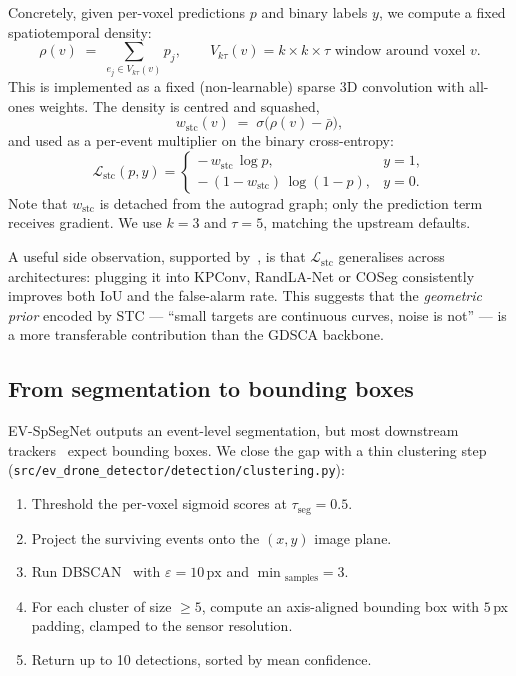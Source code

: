 \documentclass[11pt,a4paper]{article}
\begin{document}
Concretely, given per-voxel predictions $p$ and binary labels $y$,
we compute a fixed spatiotemporal density:
\begin{equation}
    \rho(v) \;=\; \sum_{e_j \in V_{k\tau}(v)} p_j,
    \qquad V_{k\tau}(v) = \text{$k\!\times\!k\!\times\!\tau$ window
    around voxel $v$.}
\end{equation}
This is implemented as a fixed (non-learnable) sparse 3D convolution
with all-ones weights. The density is centred and squashed,
\begin{equation}
    w_\text{stc}(v) \;=\; \sigma\bigl(\rho(v) - \bar{\rho}\bigr),
\end{equation}
and used as a per-event multiplier on the binary cross-entropy:
\begin{equation}
    \mathcal{L}_\text{stc}(p, y) =
    \begin{cases}
       -\,w_\text{stc}\,\log p,        & y = 1,\\[2pt]
       -\,(1 - w_\text{stc})\,\log(1 - p), & y = 0.
    \end{cases}
\end{equation}
Note that $w_\text{stc}$ is detached from the autograd graph; only
the prediction term receives gradient. We use $k = 3$ and $\tau = 5$,
matching the upstream defaults.

A useful side observation, supported by~\cite[Tab.~6]{chen2025evspsegnet},
is that $\mathcal{L}_\text{stc}$ generalises across architectures:
plugging it into KPConv, RandLA-Net or COSeg consistently improves
both IoU and the false-alarm rate. This suggests that the
\emph{geometric prior} encoded by STC --- ``small targets are
continuous curves, noise is not'' --- is a more transferable
contribution than the GDSCA backbone.

\subsection{From segmentation to bounding boxes}

EV-SpSegNet outputs an event-level segmentation, but most downstream
trackers~\cite{zhang2022bytetrack} expect bounding boxes. We close
the gap with a thin clustering step
(\texttt{src/ev\_drone\_detector/detection/clustering.py}):

\begin{enumerate}
\setlength\itemsep{0.2em}
  \item Threshold the per-voxel sigmoid scores at $\tau_\text{seg} = 0.5$.
  \item Project the surviving events onto the $(x, y)$ image plane.
  \item Run DBSCAN~\cite{ester1996dbscan} with $\varepsilon = 10\,\text{px}$
        and $\min\!_\text{samples} = 3$.
  \item For each cluster of size $\ge 5$, compute an axis-aligned
        bounding box with $5$\,px padding, clamped to the sensor
        resolution.
  \item Return up to 10 detections, sorted by mean confidence.
\end{enumerate}
\end{document}
